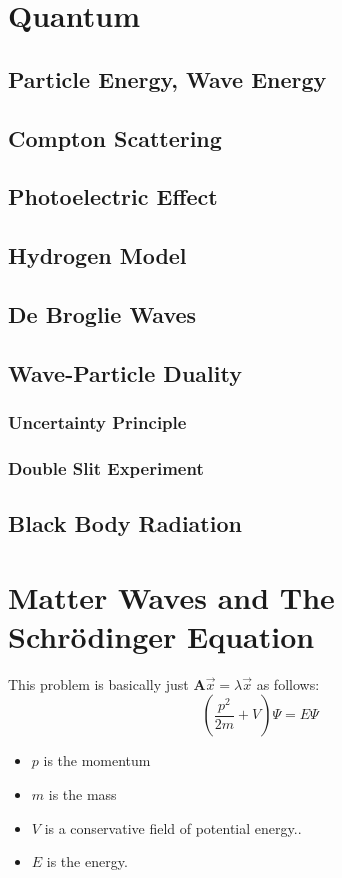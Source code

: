 \documentclass[a4paper,12pt]{report}
\begin{document}
\chapter{Quantum}
\section{Particle Energy, Wave Energy}

\section{Compton Scattering}
\section{Photoelectric Effect}
\section{Hydrogen Model}
\section{De Broglie Waves}
\section{Wave-Particle Duality}
\subsection{Uncertainty Principle}
\subsection{Double Slit Experiment}
\section{Black Body Radiation}


\chapter{Matter Waves and The Schrödinger Equation}
This problem is basically just $\pmb{A}\vec{x} = \lambda \vec{x}$ as follows:
$$(\frac{p^2}{2m} + V) \Psi = E\Psi$$
\begin{itemize}
\item $p$ is the momentum
\item $m$ is the mass
\item $V$ is a conservative field of potential energy..
\item $E$ is the energy.
\end{itemize}
\end{document}
